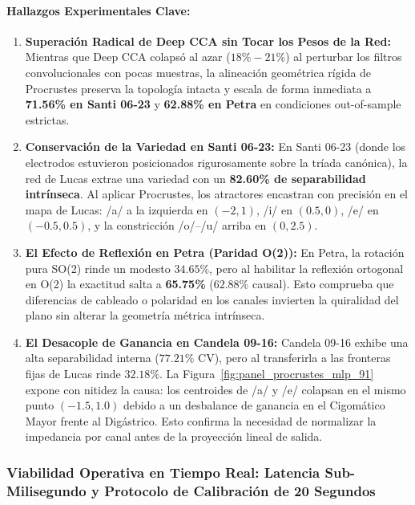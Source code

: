\documentclass[11pt,a4paper,openany]{book}
\theoremstyle{definition}
\begin{document}
\paragraph{Hallazgos Experimentales Clave:}
\begin{enumerate}
    \item \textbf{Superación Radical de Deep CCA sin Tocar los Pesos de la Red:}
    Mientras que Deep CCA colapsó al azar ($18\% - 21\%$) al perturbar los filtros convolucionales con pocas muestras, la alineación geométrica rígida de Procrustes preserva la topología intacta y escala de forma inmediata a \textbf{71.56\% en Santi 06-23} y \textbf{62.88\% en Petra} en condiciones out-of-sample estrictas.
    \item \textbf{Conservación de la Variedad en Santi 06-23:}
    En Santi 06-23 (donde los electrodos estuvieron posicionados rigurosamente sobre la tríada canónica), la red de Lucas extrae una variedad con un \textbf{82.60\% de separabilidad intrínseca}. Al aplicar Procrustes, los atractores encastran con precisión en el mapa de Lucas: /a/ a la izquierda en $(-2, 1)$, /i/ en $(0.5, 0)$, /e/ en $(-0.5, 0.5)$, y la constricción /o/--/u/ arriba en $(0, 2.5)$.
    \item \textbf{El Efecto de Reflexión en Petra (Paridad O(2)):}
    En Petra, la rotación pura SO(2) rinde un modesto $34.65\%$, pero al habilitar la reflexión ortogonal en O(2) la exactitud salta a \textbf{65.75\%} ($62.88\%$ causal). Esto comprueba que diferencias de cableado o polaridad en los canales invierten la quiralidad del plano sin alterar la geometría métrica intrínseca.
    \item \textbf{El Desacople de Ganancia en Candela 09-16:}
    Candela 09-16 exhibe una alta separabilidad interna ($77.21\%$ CV), pero al transferirla a las fronteras fijas de Lucas rinde $32.18\%$. La Figura~\ref{fig:panel_procrustes_mlp_91} expone con nitidez la causa: los centroides de /a/ y /e/ colapsan en el mismo punto $(-1.5, 1.0)$ debido a un desbalance de ganancia en el Cigomático Mayor frente al Digástrico. Esto confirma la necesidad de normalizar la impedancia por canal antes de la proyección lineal de salida.
\end{enumerate}

\subsubsection{Viabilidad Operativa en Tiempo Real: Latencia Sub-Milisegundo y Protocolo de Calibración de 20 Segundos}
\label{subsubsec:viabilidad_tiempo_real_procrustes}
\end{document}
